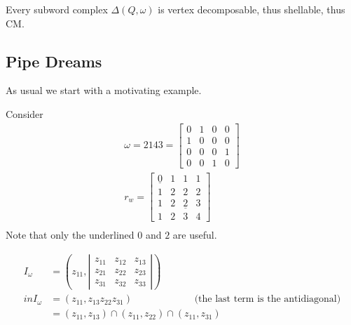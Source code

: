 \begin{theorem}
    Every subword complex $\Delta ( Q, \omega) $ is vertex decomposable, thus shellable, thus CM.
\end{theorem}

\subsection{Pipe Dreams}

As usual we start with a motivating example.

\begin{example}
Consider
\begin{align*}
\omega = 2143 =
\begin{bmatrix}
    0 & 1 & 0 & 0 \\
    1 & 0 & 0 & 0 \\
    0 & 0 & 0 & 1 \\
    0 & 0 & 1 & 0    
\end{bmatrix}\\
r_w = 
\begin{bmatrix}
    \underline{0} & 1 & 1 & 1 \\
    1 & 2 & 2 & 2 \\
    1 & 2 & \underline{2} & 3 \\
    1 & 2 & 3 & 4    
\end{bmatrix}\\
\end{align*}
Note that only the underlined $0$ and $2$ are useful.

\begin{align*}
    I_\omega &= \left( z_{11}, \left| \begin{matrix}
        z_{11} & z_{12} & z_{13} \\
        z_{21} & z_{22} & z_{23} \\
        z_{31} & z_{32} & z_{33}
    \end{matrix} \right| \right)\\
    in I_\omega &= (z_{11}, z_{13} z_{22} z_{31}) \qquad\qquad \qquad \text{ (the last term is the antidiagonal)}\\
    &= (z_{11}, z_{13}) \cap (z_{11}, z_{22}) \cap (z_{11}, z_{31})
\end{align*}


\end{example}
